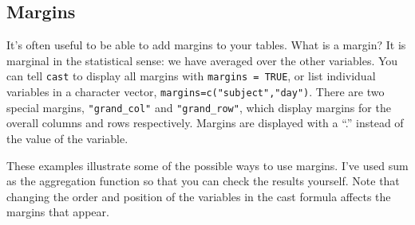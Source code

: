 \documentclass[oneside,letterpaper]{scrartcl}
\begin{document}
\subsection{Margins}\label{sub:margins}

It's often useful to be able to add margins to your tables.  What is a margin?  It is marginal in the statistical sense: we have averaged over the other variables.  You can tell {\tt cast} to display all margins with {\tt margins = TRUE}, or list individual variables in a character vector, {\tt margins=c("subject","day")}.  There are two special margins, {\tt "grand\_col"} and {\tt "grand\_row"}, which display margins for the overall columns and rows respectively. Margins are displayed with a ``.'' instead of the value of the variable. 

These examples illustrate some of the possible ways to use margins.  I've used sum as the aggregation function so that you can check the results yourself. Note that changing the order and position of the variables in the cast formula affects the margins that appear.  
\end{document}

